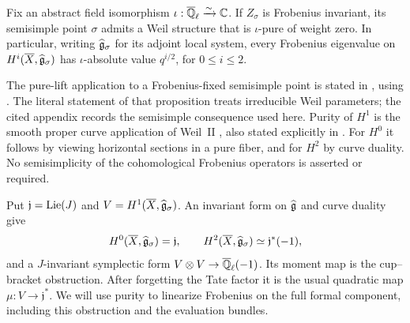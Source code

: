 \begin{theorem}\label{inp:pure-lift}
Fix an abstract field isomorphism $\iota:\overline{\mathbb Q}_{\ell}\xrightarrow{\sim}\mathbb C$.
If $Z_\sigma$ is Frobenius invariant, its semisimple point $\sigma$
admits a Weil structure that is $\iota$-pure of weight zero.  In
particular, writing $\widehat{\mathfrak g}_\sigma$ for its adjoint local system, every
Frobenius eigenvalue on
$H^i(\overline X,\widehat{\mathfrak g}_\sigma)$ has $\iota$-absolute value $q^{i/2}$,
for $0\leq i\leq2$.
\end{theorem}

The pure-lift application to a Frobenius-fixed semisimple point is
stated in \cite[Appendix~A.5.4--A.5.5]{GLR}, using
\cite[Corollary~3.7.4 and Proposition~25.4.6]{AGKRRV1}.
The literal statement of that proposition treats irreducible Weil
parameters; the cited appendix records the semisimple consequence used
here.  Purity of $H^1$ is the smooth proper curve application of
Weil~II \cite[Corollary~3.3.6 and \S3.3.10]{Deligne}, also stated explicitly in
\cite[Appendix~A.5.5]{GLR}.  For $H^0$ it follows by viewing horizontal
sections in a pure fiber, and for $H^2$ by curve duality.
No semisimplicity of the cohomological Frobenius operators is asserted
or required.

Put $\mathfrak j=\operatorname{Lie}(J)$ and
$V=H^1(\overline X,\widehat{\mathfrak g}_\sigma)$.
An invariant form on $\widehat{\mathfrak g}$ and curve duality give
\[
 H^0(\overline X,\widehat{\mathfrak g}_\sigma)=\mathfrak j,
 \qquad H^2(\overline X,\widehat{\mathfrak g}_\sigma)\simeq\mathfrak j^*(-1),
\]
and a $J$-invariant symplectic form
$V\otimes V\to\overline{\mathbb Q}_{\ell}(-1)$.  Its moment map is the cup--bracket
obstruction.  After forgetting the Tate factor it is the usual
quadratic map $\mu:V\to\mathfrak j^*$.
We will use purity to linearize Frobenius on the full formal component,
including this obstruction and the evaluation bundles.
